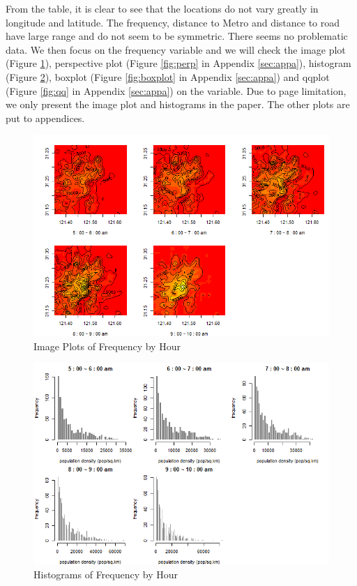 \documentclass[hidelinks,12pt]{article}
\begin{document}
	From the table, it is clear to see that the locations do not vary greatly in longitude and latitude. The frequency, distance to Metro and distance to road have large range and do not seem to be symmetric. There seems no problematic data. We then focus on the frequency variable and we will check the image plot (Figure \ref{fig:image}), perspective plot (Figure \ref{fig:perp} in Appendix \ref{sec:appa}), histogram (Figure \ref{fig:hist}), boxplot (Figure \ref{fig:boxplot} in Appendix \ref{sec:appa}) and qqplot (Figure \ref{fig:qq} in Appendix \ref{sec:appa}) on the variable. Due to page limitation, we only present the image plot and histograms in the paper. The other plots are put to appendices.
	\begin{figure}[!ht]
		\includegraphics[width=\textwidth]{image.png}
		\caption{Image Plots of Frequency by Hour \label{fig:image}}
	\end{figure}
	\begin{figure}[!ht]
		\includegraphics[width=\textwidth]{hist.png}
		\caption{Histograms of Frequency by Hour \label{fig:hist}}
	\end{figure}
\end{document}
